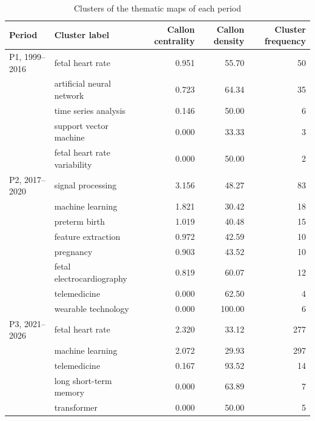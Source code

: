 \begin{table}[!ht]
\caption{Clusters of the thematic maps of each period}
\centering
\small
\begin{tabular}{@{}llrrr@{}}
\toprule
Period & Cluster label & Callon centrality & Callon density & Cluster frequency \\
\midrule
P1, 1999--2016 & fetal heart rate & 0.951 & 55.70 & 50 \\
 & artificial neural network & 0.723 & 64.34 & 35 \\
 & time series analysis & 0.146 & 50.00 & 6 \\
 & support vector machine & 0.000 & 33.33 & 3 \\
 & fetal heart rate variability & 0.000 & 50.00 & 2 \\
P2, 2017--2020 & signal processing & 3.156 & 48.27 & 83 \\
 & machine learning & 1.821 & 30.42 & 18 \\
 & preterm birth & 1.019 & 40.48 & 15 \\
 & feature extraction & 0.972 & 42.59 & 10 \\
 & pregnancy & 0.903 & 43.52 & 10 \\
 & fetal electrocardiography & 0.819 & 60.07 & 12 \\
 & telemedicine & 0.000 & 62.50 & 4 \\
 & wearable technology & 0.000 & 100.00 & 6 \\
P3, 2021--2026 & fetal heart rate & 2.320 & 33.12 & 277 \\
 & machine learning & 2.072 & 29.93 & 297 \\
 & telemedicine & 0.167 & 93.52 & 14 \\
 & long short-term memory & 0.000 & 63.89 & 7 \\
 & transformer & 0.000 & 50.00 & 5 \\
\bottomrule
\end{tabular}
\end{table}
